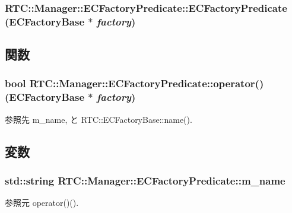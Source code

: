 \subsubsection[{ECFactoryPredicate}]{\setlength{\rightskip}{0pt plus 5cm}RTC::Manager::ECFactoryPredicate::ECFactoryPredicate ({\bf ECFactoryBase} $\ast$ {\em factory})\hspace{0.3cm}{\ttfamily  [inline]}}\label{structRTC_1_1Manager_1_1ECFactoryPredicate_a11d231c5d1145dee8137703c7dd1ad5c}


\subsection{関数}
\subsubsection[{operator()}]{\setlength{\rightskip}{0pt plus 5cm}bool RTC::Manager::ECFactoryPredicate::operator() ({\bf ECFactoryBase} $\ast$ {\em factory})\hspace{0.3cm}{\ttfamily  [inline]}}\label{structRTC_1_1Manager_1_1ECFactoryPredicate_a35e4b2a94d5093eb1c4475d8385d7dbd}


参照先 m\_\-name, と RTC::ECFactoryBase::name().



\subsection{変数}
\subsubsection[{m\_\-name}]{\setlength{\rightskip}{0pt plus 5cm}std::string {\bf RTC::Manager::ECFactoryPredicate::m\_\-name}}\label{structRTC_1_1Manager_1_1ECFactoryPredicate_a3909d7800075eec8117fef8cc864a067}


参照元 operator()().

